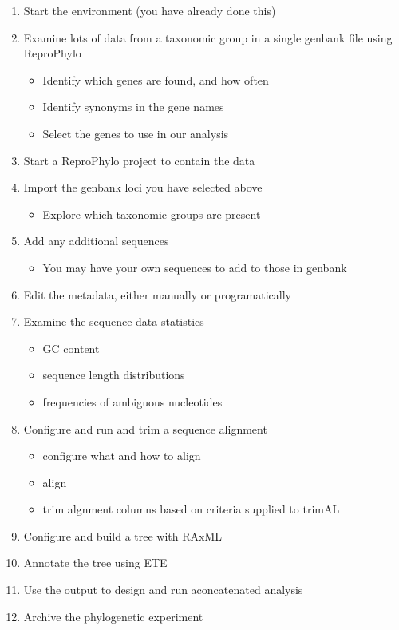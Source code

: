 \documentclass[letterpaper,10pt,english]{/usr/share/sphinx/texinputs/sphinxhowto}
\begin{document}
\begin{enumerate}
\def\labelenumi{\arabic{enumi}.}
\itemsep1pt\parskip0pt
\item
  Start the environment (you have already done this)
\item
  Examine lots of data from a taxonomic group in a single genbank file
  using ReproPhylo

  \begin{itemize}
  \itemsep1pt\parskip0pt
  \item
    Identify which genes are found, and how often
  \item
    Identify synonyms in the gene names
  \item
    Select the genes to use in our analysis
  \end{itemize}
\item
  Start a ReproPhylo project to contain the data
\item
  Import the genbank loci you have selected above

  \begin{itemize}
  \itemsep1pt\parskip0pt
  \item
    Explore which taxonomic groups are present
  \end{itemize}
\item
  Add any additional sequences

  \begin{itemize}
  \itemsep1pt\parskip0pt
  \item
    You may have your own sequences to add to those in genbank
  \end{itemize}
\item
  Edit the metadata, either manually or programatically\\
\item
  Examine the sequence data statistics

  \begin{itemize}
  \itemsep1pt\parskip0pt
  \item
    GC content
  \item
    sequence length distributions
  \item
    frequencies of ambiguous nucleotides
  \end{itemize}
\item
  Configure and run and trim a sequence alignment

  \begin{itemize}
  \itemsep1pt\parskip0pt
  \item
    configure what and how to align
  \item
    align
  \item
    trim algnment columns based on criteria supplied to trimAL
  \end{itemize}
\item
  Configure and build a tree with RAxML
\item
  Annotate the tree using ETE
\item
  Use the output to design and run aconcatenated analysis
\item
  Archive the phylogenetic experiment


\end{enumerate}
\end{document}
